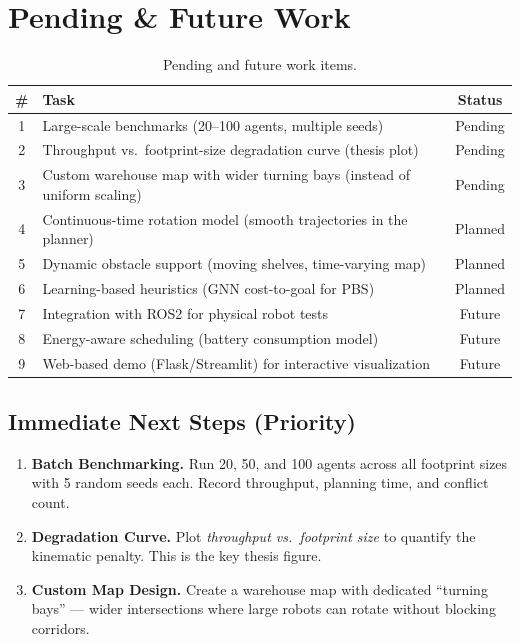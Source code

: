 \documentclass[12pt, a4paper]{article}
\begin{document}
\section{Pending \& Future Work}
\label{sec:future}

\begin{table}[H]
\centering
\small
\begin{tabular}{@{}clc@{}}
\toprule
\textbf{\#} & \textbf{Task} & \textbf{Status} \\
\midrule
1 & Large-scale benchmarks (20--100 agents, multiple seeds) & Pending \\
2 & Throughput vs.\ footprint-size degradation curve (thesis plot) & Pending \\
3 & Custom warehouse map with wider turning bays (instead of uniform scaling) & Pending \\
4 & Continuous-time rotation model (smooth trajectories in the planner) & Planned \\
5 & Dynamic obstacle support (moving shelves, time-varying map) & Planned \\
6 & Learning-based heuristics (GNN cost-to-goal for PBS) & Planned \\
7 & Integration with ROS2 for physical robot tests & Future \\
8 & Energy-aware scheduling (battery consumption model) & Future \\
9 & Web-based demo (Flask/Streamlit) for interactive visualization & Future \\
\bottomrule
\end{tabular}
\caption{Pending and future work items.}
\label{tab:future}
\end{table}

\subsection{Immediate Next Steps (Priority)}

\begin{enumerate}
    \item \textbf{Batch Benchmarking.} Run 20, 50, and 100 agents across all footprint sizes with 5 random seeds each. Record throughput, planning time, and conflict count.

    \item \textbf{Degradation Curve.} Plot \emph{throughput vs.\ footprint size} to quantify the kinematic penalty. This is the key thesis figure.

    \item \textbf{Custom Map Design.} Create a warehouse map with dedicated ``turning bays'' --- wider intersections where large robots can rotate without blocking corridors.
\end{enumerate}
\end{document}
